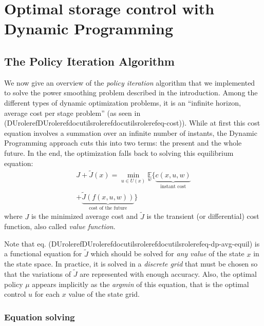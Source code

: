 \documentclass[letterpaper,compsoc,twoside]{IEEEtran}
\providecommand*{\DUrole}[2]{\ifcsname DUrole#1\endcsname \csname DUrole#1\endcsname{#2}\else \ifcsname docutilsrole#1\endcsname \csname docutilsrole#1\endcsname{#2}\else #2\fi \fi }
\begin{document}
\section{Optimal storage control with Dynamic Programming\label{optimal-storage-control-with-dynamic-programming}\label{s-opt-sto-ctrl}}


\subsection{The Policy Iteration Algorithm\label{the-policy-iteration-algorithm}\label{ss-pol-iter}}


We now give an overview of the \emph{policy iteration}
algorithm that we implemented to solve the power smoothing problem
described in the introduction. Among the different types of dynamic
optimization problems, it is an “infinite horizon, average cost per
stage problem” (as seen in (\DUrole{ref}{eq-cost})). While at first this cost equation involves
a summation over an infinite number of instants, the Dynamic Programming
approach cuts this into two terms: the present and the whole future. In
the end, the optimization falls back to solving this equilibrium
equation:\begin{equation}
\label{eq-dp-avg-equil}
 \begin{split}
 J + \tilde{J}(x) = \min_{u \in U(x)}                \underset{w}{\mathbb{E}}               \Big\lbrace                 \underbrace{ c(x, u, w)
                           }_{\text{instant cost}}\\
            +
            \underbrace{  \tilde{J}(f(x, u, w))
                           }_{\text{cost of the future}}
             \Big\rbrace   \end{split}
\end{equation}where $J$ is the minimized average cost and $\tilde{J}$ is
the transient (or differential) cost function, also called \emph{value
function}.

Note that eq. (\DUrole{ref}{eq-dp-avg-equil}) is a functional equation for $\tilde{J}$ which
should be solved for \emph{any value} of the state $x$ in the state
space. In practice, it is solved in a \emph{discrete grid} that must be
chosen so that the variations of $\tilde{J}$ are represented with
enough accuracy. Also, the optimal policy $\mu$ appears implicitly
as the \emph{argmin} of this equation, that is the optimal control $u$
for each $x$ value of the state grid.

\subsubsection{Equation solving\label{equation-solving}}
\end{document}
